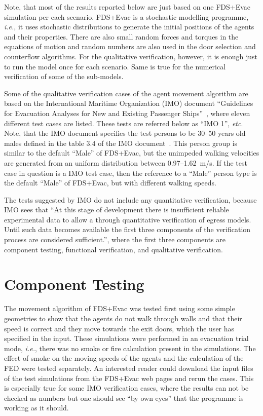\documentclass[12pt,a4paper,final,twoside]{stylevk}
\begin{document}
Note, that most of the results reported below are just based on one
FDS+Evac simulation per each scenario.  FDS+Evac is a stochastic
modelling programme, \emph{i.e.}, it uses stochastic distributions to
generate the initial positions of the agents and their properties.
There are also small random forces and torques in the equations of
motion and random numbers are also used in the door selection and
counterflow algorithms.  For the qualitative verification, however, it
is enough just to run the model once for each scenario.  Same is true
for the numerical verification of some of the sub-models.


Some of the qualitative verification cases of the agent movement
algorithm are based on the International Maritime Organization (IMO)
document ``Guidelines for Evacuation Analyses for New and Existing
Passenger Ships''~\cite{IMO07}, where eleven different test cases are
listed.  These tests are referred below as ``IMO 1'', \emph{etc}.
Note, that the IMO document specifies the test persons to be 30--50
years old males defined in the table 3.4 of the IMO
document~\cite{IMO07}.  This person group is similar to the default
``Male'' of FDS+Evac, but the unimpeded walking velocities are
generated from an uniform distribution between 0.97--1.62~m/s.  If the
test case in question is a IMO test case, then the reference to a
``Male'' person type is the default ``Male'' of FDS+Evac, but with
different walking speeds.


The tests suggested by IMO do not include any quantitative
verification, because IMO sees that ``At this stage of development
there is insufficient reliable experimental data to allow a through
quantitative verification of egress models.  Until such data becomes
available the first three components of the verification process are
considered sufficient.'', where the first three components are component
testing, functional verification, and qualitative verification.



\section{Component Testing}\label{Sec_CompTest}

\noindent The movement algorithm of FDS+Evac was tested first using
some simple geometries to show that the agents do not walk through
walls and that their speed is correct and they move towards the exit
doors, which the user has specified in the input.  These simulations
were performed in an evacuation trial mode, \emph{i.e.}, there was no
smoke or fire calculation present in the simulations.  The effect of
smoke on the moving speeds of the agents and the calculation of the
FED were tested separately.  An interested reader could download the
input files of the test simulations from the FDS+Evac web pages and
rerun the cases.  This is especially true for some IMO verification
cases, where the results can not be checked as numbers but one should
see ``by own eyes'' that the programme is working as it should.
\end{document}
